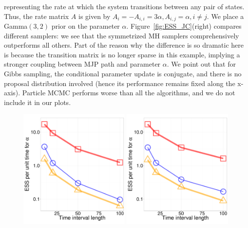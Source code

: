 {  representing the rate at which the system transitions between any pair of 
  states. Thus, the rate matrix $A$ is given by 
$A_i = -A_{i,i} = 3\alpha, A_{i, j} = \alpha,i \neq j.$
We place a Gamma$(3,2)$ prior on the parameter $\alpha$.
Figure~\ref{fig:ESS_JC}(right) compares different samplers: we see that the
symmetrized MH samplers comprehensively outperforms all others.
Part of the reason why the difference is so dramatic here is because the
transition matrix is no longer sparse in this example, implying a stronger
coupling between MJP path and parameter $\alpha$. We point out that for Gibbs
sampling, the conditional parameter update is conjugate, and there is no
proposal distribution involved (hence its performance remains fixed along
the x-axis). Particle MCMC performs worse
than all the algorithms, and we do not include it in our plots.
  \begin{figure}%
  \centering
  \begin{minipage}[!hp]{0.99\linewidth}
  \centering
    \includegraphics [width=0.49\textwidth, angle=0]{figs/ESS_vs_t_alpha_JC.pdf}
  \centering
    \includegraphics [width=0.49\textwidth, angle=0]{figs/ESS_vs_t_alpha_fixobservation_JC.pdf}

\end{minipage}
\end{figure}}
